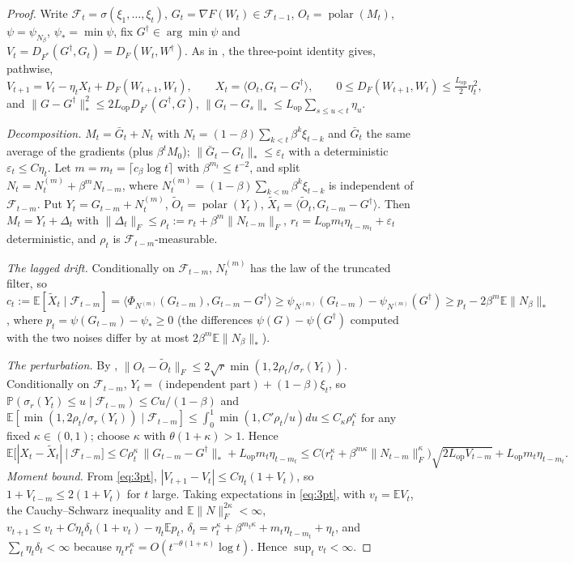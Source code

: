 \documentclass[10pt]{article}
\theoremstyle{definition}
\theoremstyle{remark}
\newcommand{\E}{\mathbb{E}}
\newcommand{\Prob}{\mathbb{P}}
\newcommand{\nnuc}[1]{\|#1\|_{*}}
\newcommand{\nF}[1]{\|#1\|_{F}}
\newcommand{\inner}[2]{\langle #1, #2\rangle}
\newcommand{\polar}{\operatorname{polar}}
\newcommand{\Lop}{L_{\mathrm{op}}}
\newcommand{\cF}{\mathcal{F}}
\newcommand{\st}{\dagger}
\begin{document}
\begin{proof}
Write $\cF_t=\sigma(\xi_1,\dots,\xi_t)$, $G_t=\nabla F(W_t)\in\cF_{t-1}$, $O_t=\polar(M_t)$, $\psi=\psi_{N_\beta}$,
$\psi_\ast=\min\psi$, fix $G^\st\in\arg\min\psi$ and $V_t=D_{F^\ast}(G^\st,G_t)=D_F(W_t,W^\st)$. As in
\cite[Theorem~2]{manuscript}, the three-point identity gives, pathwise,
\begin{equation}\label{eq:3pt}
V_{t+1}=V_t-\eta_tX_t+D_F(W_{t+1},W_t),\qquad X_t=\inner{O_t}{G_t-G^\st},\qquad0\le D_F(W_{t+1},W_t)\le\tfrac{\Lop}2\eta_t^2,
\end{equation}
and $\nnuc{G-G^\st}^2\le2\Lop D_{F^\ast}(G^\st,G)$, $\nnuc{G_{t}-G_{s}}\le\Lop\sum_{s\le u<t}\eta_u$.

\emph{Decomposition.} $M_t=\bar G_t+N_t$ with $N_t=(1-\beta)\sum_{k<t}\beta^k\xi_{t-k}$ and $\bar G_t$ the same average
of the gradients (plus $\beta^tM_0$); $\nnuc{\bar G_t-G_t}\le\varepsilon_t$ with a deterministic
$\varepsilon_t\le C\eta_t$. Let $m=m_t=\lceil c_\beta\log t\rceil$ with $\beta^{m_t}\le t^{-2}$, and split
$N_t=N_t^{(m)}+\beta^mN_{t-m}$, where $N_t^{(m)}=(1-\beta)\sum_{k<m}\beta^k\xi_{t-k}$ is independent of $\cF_{t-m}$. Put
$Y_t=G_{t-m}+N_t^{(m)}$, $\tilde O_t=\polar(Y_t)$, $\tilde X_t=\inner{\tilde O_t}{G_{t-m}-G^\st}$. Then
$M_t=Y_t+\Delta_t$ with $\nF{\Delta_t}\le\rho_t:=r_t+\beta^m\nF{N_{t-m}}$, $r_t=\Lop m_t\eta_{t-m_t}+\varepsilon_t$
deterministic, and $\rho_t$ is $\cF_{t-m}$-measurable.

\emph{The lagged drift.} Conditionally on $\cF_{t-m}$, $N_t^{(m)}$ has the law of the truncated filter, so
$c_t:=\E[\tilde X_t\mid\cF_{t-m}]=\inner{\Phi_{N^{(m)}}(G_{t-m})}{G_{t-m}-G^\st}\ge\psi_{N^{(m)}}(G_{t-m})-\psi_{N^{(m)}}(G^\st)
\ge p_t-2\beta^m\E\nnuc{N_\beta}$, where $p_t=\psi(G_{t-m})-\psi_\ast\ge0$ (the differences $\psi(G)-\psi(G^\st)$ computed with the two noises differ by at most
$2\beta^m\E\nnuc{N_\beta}$).

\emph{The perturbation.} By \cite{lisun}, $\nF{O_t-\tilde O_t}\le2\sqrt r\min(1,2\rho_t/\sigma_r(Y_t))$. Conditionally on
$\cF_{t-m}$, $Y_t=(\text{independent part})+(1-\beta)\xi_t$, so $\Prob(\sigma_r(Y_t)\le u\mid\cF_{t-m})\le Cu/(1-\beta)$
and $\E[\min(1,2\rho_t/\sigma_r(Y_t))\mid\cF_{t-m}]\le\int_0^1\min(1,C'\rho_t/u)du\le C_\kappa\rho_t^\kappa$ for any fixed
$\kappa\in(0,1)$; choose $\kappa$ with $\theta(1+\kappa)>1$. Hence
\[
\E\big[|X_t-\tilde X_t|\ \big|\ \cF_{t-m}\big]\le C\rho_t^\kappa\,\nnuc{G_{t-m}-G^\st}+\Lop m_t\eta_{t-m_t}
\le C\big(r_t^\kappa+\beta^{m\kappa}\nF{N_{t-m}}^\kappa\big)\sqrt{2\Lop V_{t-m}}+\Lop m_t\eta_{t-m_t}.
\]
\emph{Moment bound.} From \eqref{eq:3pt}, $|V_{t+1}-V_t|\le C\eta_t(1+V_t)$, so $1+V_{t-m}\le2(1+V_t)$ for $t$ large. Taking
expectations in \eqref{eq:3pt}, with $v_t=\E V_t$, the Cauchy--Schwarz inequality and $\E\nF{N}^{2\kappa}<\infty$,
$v_{t+1}\le v_t+C\eta_t\delta_t(1+v_t)-\eta_t\E p_t$, $\delta_t=r_t^\kappa+\beta^{m_t\kappa}+m_t\eta_{t-m_t}+\eta_t$, and
$\sum_t\eta_t\delta_t<\infty$ because $\eta_tr_t^\kappa=O(t^{-\theta(1+\kappa)}\log t)$. Hence $\sup_tv_t<\infty$.


\end{proof}
\end{document}
